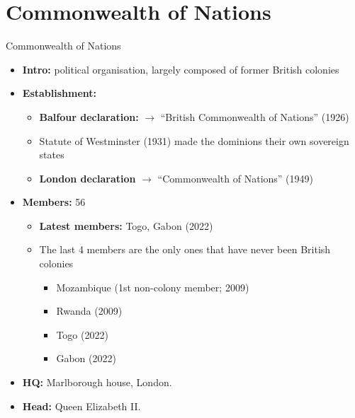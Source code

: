 \documentclass[
  12pt,
  ignorenonframetext,
  progressbar=frametitle]{beamer}
\providecommand{\tightlist}{%
  \setlength{\itemsep}{0pt}\setlength{\parskip}{0pt}}
\begin{document}
\section{Commonwealth of Nations}
\begin{frame}[allowframebreaks]
{Commonwealth of Nations}
\protect\hypertarget{commonwealth-of-nations}{}
\begin{itemize}
\tightlist
\item
  \textbf{Intro:} political organisation, largely composed of former
  British colonies
\item
  \textbf{Establishment:}

  \begin{itemize}
  \tightlist
  \item
    \textbf{Balfour declaration:} \(\rightarrow\) ``British Commonwealth
    of Nations'' (1926)
  \item
    Statute of Westminster (1931) made the dominions their own sovereign
    states
  \item
    \textbf{London declaration} \(\rightarrow\) ``Commonwealth of
    Nations'' (1949)
  \end{itemize}
\item
  \textbf{Members:} 56

  \begin{itemize}
  \tightlist
  \item
    \textbf{Latest members:} Togo, Gabon (2022)
  \item
    The last 4 members are the only ones that have never been British
    colonies

    \begin{itemize}
    \tightlist
    \item
      Mozambique (1st non-colony member; 2009)
    \item
      Rwanda (2009)
    \item
      Togo (2022)
    \item
      Gabon (2022)
    \end{itemize}
  \end{itemize}
\item
  \textbf{HQ:} Marlborough house, London.
\item
  \textbf{Head:} Queen Elizabeth II.
\end{itemize}
\end{frame}
\end{document}
